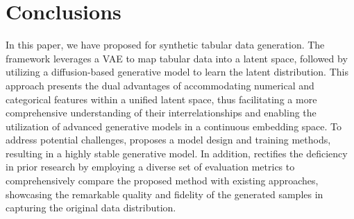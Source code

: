 \section{Conclusions}\label{sec:conclusion}
In this paper, we have proposed \modelname for synthetic tabular data generation. The \modelname framework leverages a VAE to map tabular data into a latent space, followed by utilizing a diffusion-based generative model to learn the latent distribution. This approach presents the dual advantages of accommodating numerical and categorical features within a unified latent space, thus facilitating a more comprehensive understanding of their interrelationships and enabling the utilization of advanced generative models in a continuous embedding space. To address potential challenges, \modelname{} proposes a model design and training methods, resulting in a highly stable generative model. In addition, \modelname{} rectifies the deficiency in prior research by employing a diverse set of evaluation metrics to comprehensively compare the proposed method with existing approaches, showcasing the remarkable quality and fidelity of the generated samples in capturing the original data distribution.